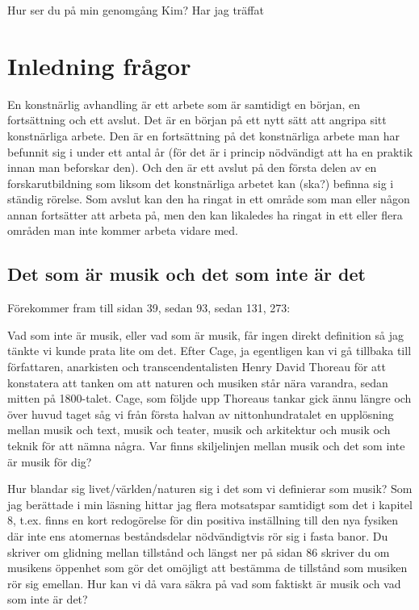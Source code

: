 \documentclass{article}
\begin{document}
Hur ser du på min genomgång Kim? Har jag träffat


\section{Inledning frågor}

En konstnärlig avhandling är ett arbete som är samtidigt en början, en fortsättning och ett avslut. Det är en början på ett nytt sätt att angripa sitt konstnärliga arbete. Den är en fortsättning på det konstnärliga arbete man har befunnit sig i under ett antal år (för det är i princip nödvändigt att ha en praktik innan man beforskar den). Och den är ett avslut på den första delen av en forskarutbildning som liksom det konstnärliga arbetet kan (ska?) befinna sig i ständig rörelse. Som avslut kan den ha ringat in ett område som man eller någon annan fortsätter att arbeta på, men den kan likaledes ha ringat in ett eller flera områden man inte kommer arbeta vidare med.

\subsection{Det som är musik och det som inte är det}

Förekommer fram till sidan 39, sedan 93, sedan 131, 273:

Vad som inte är musik, eller vad som är musik, får ingen direkt definition så jag tänkte vi kunde prata lite om det. Efter Cage, ja egentligen kan vi gå tillbaka till författaren, anarkisten och transcendentalisten Henry David Thoreau för att konstatera att tanken om att naturen och musiken står nära varandra, sedan mitten på 1800-talet. Cage, som följde upp Thoreaus tankar gick ännu längre och över huvud taget såg vi från första halvan av nittonhundratalet en upplösning mellan musik och text, musik och teater, musik och arkitektur och musik och teknik för att nämna några. Var finns skiljelinjen mellan musik och det som inte är musik för dig?

Hur blandar sig livet/världen/naturen sig i det som vi definierar som musik? Som jag berättade i min läsning hittar jag flera motsatspar samtidigt som det i kapitel 8, t.ex. finns en kort redogörelse för din positiva inställning till den nya fysiken där inte ens atomernas beståndsdelar nödvändigtvis rör sig i fasta banor. Du skriver om glidning mellan tillstånd och längst ner på sidan 86 skriver du om musikens öppenhet som gör det omöjligt att bestämma de tillstånd som musiken rör sig emellan. Hur kan vi då vara säkra på vad som faktiskt är musik och vad som inte är det?
\end{document}
